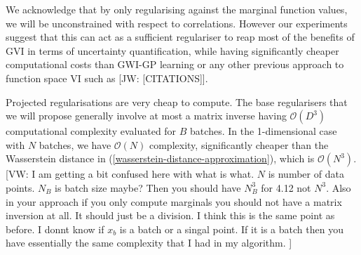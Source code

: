 \documentclass{article}
\newcommand{\jw}[1]{{\color{gray} [JW: #1]}}
\newcommand{\vw}[1]{{\color{green} [VW: #1]}}
\numberwithin{equation}{section}
\begin{document}
We acknowledge that by only regularising against the marginal function values, we will be unconstrained with respect to correlations. 
However our experiments suggest that this can act as a  sufficient regulariser to reap most of the benefits of GVI in terms of uncertainty quantification, while having significantly cheaper computational costs than GWI-GP learning or any other previous approach to function space VI such as \jw{[CITATIONS]}.

Projected regularisations are very cheap to compute. 
The base regularisers that we will propose generally involve at most a matrix inverse having $\mathcal{O}(D^3)$ computational complexity evaluated for $B$ batches. 
In the 1-dimensional case with $N$ batches, we have $\mathcal{O}(N)$ complexity, significantly cheaper than the Wasserstein distance in (\ref{wasserstein-distance-approximation}), which is $\mathcal{O}(N^3)$. \vw{I am getting a bit confused here with what is what. $N$ is number of data points. $N_B$ is batch size maybe? Then you should have $N_B^3$ for 4.12 not $N^3$. Also in your approach if you only compute marginals you should not have a matrix inversion at all. It should just be a division. I think this is the same point as before. I donnt know if $x_b$ is a batch or a singal point. If it is a batch then you have essentially the same complexity that I had in my algorithm. } 
\end{document}
